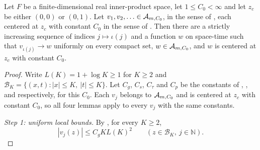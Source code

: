 \begin{lemma}
Let $F$ be a finite-dimensional real inner-product space, let
$1\le C_0<\infty$ and let $z_c$ be either $(0,0)$ or $(0,1)$. Let
$v_1,v_2,\ldots\in\mathcal{A}_{m,C_0}$, in the sense of , each
centered at $z_c$ with constant $C_0$ in the sense of .
Then there are a strictly increasing sequence of indices $j\mapsto\iota(j)$ and a
function $w$ on space-time such that $v_{\iota(j)}\to w$ uniformly on every
compact set, $w\in\mathcal{A}_{m,C_0}$, and $w$ is centered at $z_c$ with constant
$C_0$.
\end{lemma}
\begin{proof}
Write $L(K)=1+\log K\ge1$ for $K\ge2$ and
$\mathcal B_K=\{(x,t):|x|\le K,\ |t|\le K\}$. Let $C_g$, $C_s$, $C_\tau$ and
$C_p$ be the constants of , ,
 and  respectively, for this
$C_0$. Each $v_j$ belongs to $\mathcal{A}_{m,C_0}$ and is centered at $z_c$ with
constant $C_0$, so all four lemmas apply to every $v_j$ with the same
constants.

\emph{Step 1: uniform local bounds.}
By , for every $K\ge2$,
\begin{equation}\label{eq:cc-bound}
  |v_j(z)|\le C_gKL(K)^2\qquad(z\in\mathcal B_K,\ j\in\mathbb N).
\end{equation}


\end{proof}

